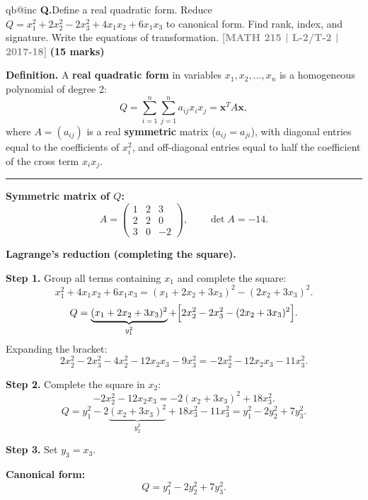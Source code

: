 \documentclass[12pt,a3paper]{article}
\makeatletter
\newcommand{\yr}[1]{\hfill\textcolor{gray}{\small\textbf{[#1]}}}
\newcommand{\mk}[1]{\textcolor{orange!70!black}{\small\textbf{(#1 marks)}}}
\newcounter{qnum}
\newcommand{\Q}[1]{%
  \csname qb@inc\endcsname
  \needspace{4\baselineskip}
  \refstepcounter{qnum}
  \vspace{6pt}
  \noindent\textbf{Q\theqnum.}\enspace #1\par
}
\makeatother
\begin{document}
\Q{Define a real quadratic form. Reduce $Q = x_1^2 + 2x_2^2 - 2x_3^2 + 4x_1x_2 + 6x_1x_3$ to canonical form. Find rank, index, and signature. Write the equations of transformation.
\yr{MATH 215 | L-2/T-2 | 2017-18} \mk{15}}

\begin{tcolorbox}[enhanced,breakable,
  colback=cE!4,colframe=cE,boxrule=0.8pt,arc=5pt,
  title={\textbf{Answer --- Real Quadratic Form \& Canonical Reduction of
    $Q = x_1^2+2x_2^2-2x_3^2+4x_1x_2+6x_1x_3$}},
  fonttitle=\bfseries\color{white},colbacktitle=cE]

\textbf{Definition.}
A \textbf{real quadratic form} in variables $x_1,x_2,\ldots,x_n$ is a
homogeneous polynomial of degree 2:
\[
  Q = \sum_{i=1}^n\sum_{j=1}^n a_{ij}x_i x_j = \mathbf{x}^T A \mathbf{x},
\]
where $A=(a_{ij})$ is a real \textbf{symmetric} matrix ($a_{ij}=a_{ji}$),
with diagonal entries equal to the coefficients of $x_i^2$, and
off-diagonal entries equal to half the coefficient of the cross term $x_ix_j$.

\medskip\textcolor{cE}{\rule{\textwidth}{0.4pt}}

\textbf{Symmetric matrix of $Q$:}
\[
  A = \begin{pmatrix}1&2&3\\2&2&0\\3&0&-2\end{pmatrix}, \qquad \det A = -14.
\]

\textbf{Lagrange's reduction (completing the square).}

\textbf{Step 1.} Group all terms containing $x_1$ and complete the square:
\[
  x_1^2 + 4x_1 x_2 + 6x_1 x_3
  = (x_1 + 2x_2 + 3x_3)^2 - (2x_2+3x_3)^2.
\]
\[
  Q = \underbrace{(x_1+2x_2+3x_3)^2}_{y_1^2}
    + \Bigl[2x_2^2 - 2x_3^2 - (2x_2+3x_3)^2\Bigr].
\]
Expanding the bracket:
\[
  2x_2^2-2x_3^2 - 4x_2^2-12x_2 x_3-9x_3^2 = -2x_2^2-12x_2 x_3-11x_3^2.
\]

\textbf{Step 2.} Complete the square in $x_2$:
\[
  -2x_2^2 - 12x_2 x_3
  = -2(x_2+3x_3)^2 + 18x_3^2.
\]
\[
  Q = y_1^2 - 2\underbrace{(x_2+3x_3)^2}_{y_2^2}
    + 18x_3^2 - 11x_3^2
  = y_1^2 - 2y_2^2 + 7y_3^2.
\]

\textbf{Step 3.} Set $y_3 = x_3$.

\medskip
\textbf{Canonical form:}
\[
  \boxed{Q = y_1^2 - 2y_2^2 + 7y_3^2.}
\]


\end{tcolorbox}
\end{document}
